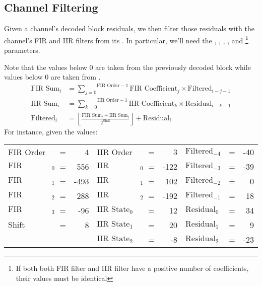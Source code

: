 \clearpage

\subsection{Channel Filtering}

Given a channel's decoded block residuals, we then filter those residuals
with the channel's FIR and IIR filters from its .
In particular, we'll need the , ,
, ,  and
\footnote{If both both FIR filter and IIR filter
have a positive number of coefficients, their  values must be
identical}
parameters.

Note that the  values below 0 are taken from the previously
decoded block while  values below 0 are taken from
.
\begin{align*}
\text{FIR Sum}_i &= \overset{\text{FIR Order} - 1}{\underset{j = 0}{\sum}}{\text{FIR Coefficient}_j \times \text{Filtered}_{i - j - 1}} \\
\text{IIR Sum}_i &= \overset{\text{IIR Order} - 1}{\underset{k = 0}{\sum}}{\text{IIR Coefficient}_k \times \text{Residual}_{i - k - 1}} \\
\text{Filtered}_i &= \left\lfloor\frac{\text{FIR Sum}_i + \text{IIR Sum}_i}{2 ^ {\text{Shift}}}\right\rfloor + \text{Residual}_i
\end{align*}
For instance, given the values:
\par
\noindent
\begin{tabular}{l c r l c r l c r}
FIR Order & = & 4 &
IIR Order & = & 3 &
$\text{Filtered}_{-4}$ & = & -40 \\
$\text{FIR Coefficient}_0$ & = & 556 &
$\text{IIR Coefficient}_0$ & = & -122 &
$\text{Filtered}_{-3}$ & = & -39 \\
$\text{FIR Coefficient}_1$ & = & -493 &
$\text{IIR Coefficient}_1$ & = & 102 &
$\text{Filtered}_{-2}$ & = & 0 \\
$\text{FIR Coefficient}_2$ & = & 288 &
$\text{IIR Coefficient}_2$ & = & -192 &
$\text{Filtered}_{-1}$ & = & 18 \\
$\text{FIR Coefficient}_3$ & = & -96 &
$\text{IIR State}_0$ & = & 12 &
$\text{Residual}_0$ & = & 34 \\
$\text{Shift}$ & = & 8 &
$\text{IIR State}_1$ & = & 20 &
$\text{Residual}_1$ & = & 9 \\
& & &
$\text{IIR State}_2$ & = & -8 &
$\text{Residual}_2$ & = & -23 \\
\end{tabular}

